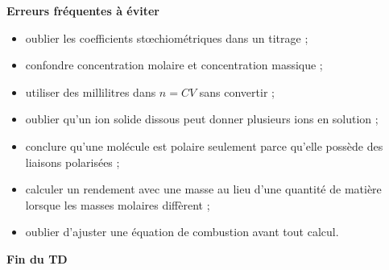 \documentclass[11pt,a4paper]{article}
\begin{document}
\begin{erreurbox}
\textbf{Erreurs fréquentes à éviter}
\begin{itemize}
  \item oublier les coefficients stœchiométriques dans un titrage ;
  \item confondre concentration molaire et concentration massique ;
  \item utiliser des millilitres dans $n=CV$ sans convertir ;
  \item oublier qu'un ion solide dissous peut donner plusieurs ions en solution ;
  \item conclure qu'une molécule est polaire seulement parce qu'elle possède des liaisons polarisées ;
  \item calculer un rendement avec une masse au lieu d'une quantité de matière lorsque les masses molaires diffèrent ;
  \item oublier d'ajuster une équation de combustion avant tout calcul.
\end{itemize}
\end{erreurbox}

\begin{center}
\Large\bfseries Fin du TD
\end{center}
\end{document}
